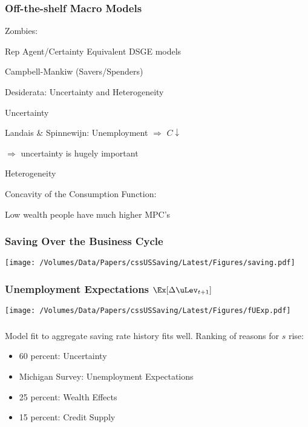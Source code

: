 \begin{frame}\frametitle{Off-the-shelf Macro Models}

Zombies:
\bi
\item Rep Agent/Certainty Equivalent DSGE models
\item Campbell-Mankiw (Savers/Spenders)
\ei

Desiderata: Uncertainty and Heterogeneity
\bi
\item Uncertainty
\bi
\item Landais \& Spinnewijn: Unemployment $\Rightarrow$ $C \downarrow$
\item $\Rightarrow$ uncertainty is hugely important
\ei
\item Heterogeneity
\bi
\item Concavity of the Consumption Function:
\bi
\item Low wealth people have much higher MPC's
\ei
\ei
\ei



\end{frame}

\begin{frame}\frametitle{Saving Over the Business Cycle}
\begin{center}
\texttt{[image: /Volumes/Data/Papers/cssUSSaving/Latest/Figures/saving.pdf]}
\end{center}
\end{frame}

\begin{frame}\frametitle{Unemployment Expectations $\Ex[\Delta \uLev_{t+1}]$}
\begin{center}
\texttt{[image: /Volumes/Data/Papers/cssUSSaving/Latest/Figures/fUExp.pdf]}
\end{center}
\end{frame}


\begin{frame}\frametitle{\cite{cssUSSaving}}

Model fit to aggregate saving rate history fits well.  Ranking of reasons for $s$ rise: \pause
\begin{itemize}
\item 60 percent: Uncertainty
\bi
\item Michigan Survey: Unemployment Expectations
\ei
\item 25 percent: Wealth Effects
\item 15 percent: Credit Supply
\end{itemize}

\end{frame}

